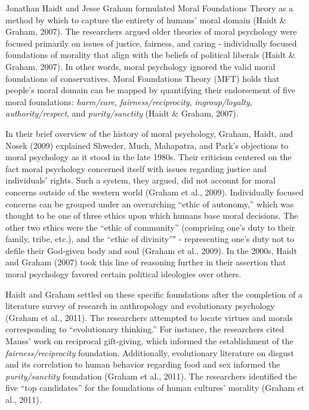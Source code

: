 \documentclass[,man]{apa6}
\begin{document}
Jonathan Haidt and Jesse Graham formulated Moral Foundations Theory as a
method by which to capture the entirety of humans' moral domain (Haidt
\& Graham, 2007). The researchers argued older theories of moral
psychology were focused primarily on issues of justice, fairness, and
caring - individually focused foundations of morality that align with
the beliefs of political liberals (Haidt \& Graham, 2007). In other
words, moral psychology ignored the valid moral foundations of
conservatives. Moral Foundations Theory (MFT) holds that people's moral
domain can be mapped by quantifying their endorsement of five moral
foundations: \emph{harm/care}, \emph{fairness/reciprocity},
\emph{ingroup/loyalty}, \emph{authority/respect}, and
\emph{purity/sanctity} (Haidt \& Graham, 2007).

In their brief overview of the history of moral psychology, Graham,
Haidt, and Nosek (2009) explained Shweder, Much, Mahapatra, and Park's
objections to moral psychology as it stood in the late 1980s. Their
criticism centered on the fact moral psychology concerned itself with
issues regarding justice and individuals' rights. Such a system, they
argued, did not account for moral concerns outside of the western world
(Graham et al., 2009). Individually focused concerns can be grouped
under an overarching \enquote{ethic of autonomy,} which was thought to
be one of three ethics upon which humans base moral decisions. The other
two ethics were the \enquote{ethic of community} (comprising one's duty
to their family, tribe, etc.), and the \enquote{ethic of divinity}" -
representing one's duty not to defile their God-given body and soul
(Graham et al., 2009). In the 2000s, Haidt and Graham (2007) took this
line of reasoning further in their assertion that moral psychology
favored certain political ideologies over others.

Haidt and Graham settled on these specific foundations after the
completion of a literature survey of research in anthropology and
evolutionary psychology (Graham et al., 2011). The researchers attempted
to locate virtues and morals corresponding to \enquote{evolutionary
thinking.} For instance, the researchers cited Mauss' work on reciprocal
gift-giving, which informed the establishment of the
\emph{fairness/reciprocity} foundation. Additionally, evolutionary
literature on disgust and its correlation to human behavior regarding
food and sex informed the \emph{purity/sanctity} foundation (Graham et
al., 2011). The researchers identified the five \enquote{top candidates}
for the foundations of human cultures' morality (Graham et al., 2011).
\end{document}
